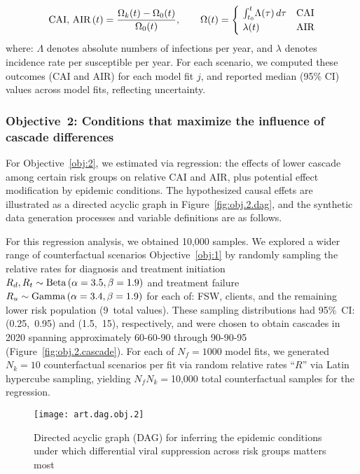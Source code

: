 \begin{equation}
  \textnormal{CAI, AIR}\,(t) = \frac{\Omega_{k}(t) - \Omega_{0}(t)}{\Omega_{0}(t)}
  ,\qquad \Omega(t) =
  \begin{cases}
    ~\int_{t_0}^{t}\!\Lambda(\tau)\,d\tau & \textnormal{CAI} \\
    ~\lambda(t) & \textnormal{AIR}
  \end{cases}
\end{equation} where:
$\Lambda$ denotes absolute numbers of infections per year, and
$\lambda$ denotes incidence rate per susceptible per year.
For each scenario, we computed these outcomes (CAI and AIR) for each model fit $j$,
and reported median (95\% CI) values across model fits, reflecting uncertainty.
\subsubsection*{Objective~2: Conditions that maximize the influence of cascade differences}\label{meth.obj.2}
For Objective~\ref{obj:2}, we estimated via regression:
the effects of lower cascade among certain risk groups on relative CAI and AIR,
plus potential effect modification by epidemic conditions.
The hypothesized causal effets are illustrated
as a directed acyclic graph in Figure~\ref{fig:obj.2.dag},
and the synthetic data generation processes and variable definitions are as follows.
\par
For this regression analysis, we obtained 10,000 samples.
We explored a wider range of counterfactual scenarios \vs Objective~\ref{obj:1}
by randomly sampling the relative rates for
diagnosis and treatment initiation $R_d, R_t \sim \textnormal{Beta}\,(\alpha=3.5,\beta=1.9)$
and treatment failure $R_u \sim \textnormal{Gamma}\,(\alpha=3.4,\beta=1.9)$
for each of: FSW, clients, and the remaining lower risk population (9~total values).
These sampling distributions had 95\%~CI: (0.25,~0.95) and (1.5,~15), respectively,
and were chosen to obtain cascades in 2020 spanning
approximately \mbox{60-60-90} through \mbox{90-90-95} (Figure~\ref{fig:obj.2.cascade}). %
For each of $N_f = 1000$ model fits, we generated $N_k = 10$ counterfactual scenarios per fit
via random relative rates ``$R$'' via Latin hypercube sampling,
yielding $N_f N_k = {}$10,000 total counterfactual samples for the regression.
\begin{figure}
  \centering\texttt{[image: art.dag.obj.2]}
  \caption{Directed acyclic graph (DAG) for inferring
    the epidemic conditions under which
    differential viral suppression across risk groups matters most}
  \label{fig:art.2.dag}
\end{figure}
